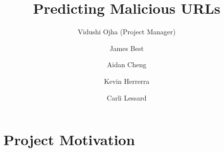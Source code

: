 \documentclass[cs,proposal]{hmcclinic}
\title{Predicting Malicious URLs}
\author{Vidushi Ojha (Project Manager) \and James Best \and Aidan Cheng \and Kevin Herrerra \and Carli Lessard}
\begin{document}

\maketitle

\tableofcontents








\newpage


\section{Project Motivation}
\end{document}

